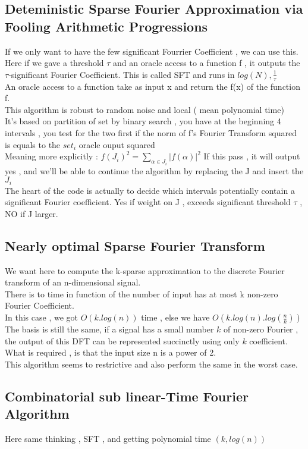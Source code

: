 \documentclass{article}
\begin{document}
\subsection{Deteministic Sparse Fourier Approximation via Fooling Arithmetic Progressions}
If we only want to have the few significant Fourrier Coefficient , we can use this.\\
Here if we gave a threshold $\tau$ and an oracle access to a function f , it outputs the $\tau$-significant Fourier Coefficient. This is called SFT and runs in $log(N) ,\frac{1}{\tau}$\\
An oracle access to a function take as input x and return the f(x) of the function f.\\
This algorithm is robust to random noise and local ( mean polynomial time)\\
It's based on partition of set by binary search , you have at the beginning 4 intervals , you test for the two first if the norm of f's Fourier Transform squared is equals to the $set_i$ oracle ouput squared\\
Meaning more explicitly : $f(J_i)^2 = \sum_{\alpha \in J_i}{|f(\alpha)|^2}$ If this pass , it will output yes , and we'll be able to continue the algorithm by replacing the J and insert the $J_i$\\
The heart of the code is actually to decide which intervals potentially contain a significant Fourier coefficient. Yes if weight on J , exceeds significant threshold $\tau$ , NO if J larger.
\subsection{Nearly optimal Sparse Fourier Transform}
We want here to compute the k-sparse approximation to the discrete Fourier transform of an n-dimensional signal.\\
There is to time in function of the number of input has at most k non-zero Fourier Coefficient.\\
In this case , we got $O(k.log(n))$ time , else we have $O(k.log(n).log(\frac{n}{k}))$\\
The basis is still the same, if a signal has a small number $k$ of non-zero Fourier , the output of this DFT can be represented succinctly using only $k$ coefficient.\\
What is required , is that the input size n is a power of 2.\\
This algorithm seems to restrictive and also perform the same in the worst case.\\
\subsection{Combinatorial sub linear-Time Fourier Algorithm}
Here same thinking , SFT , and getting polynomial time $(k,log(n))$
\end{document}
